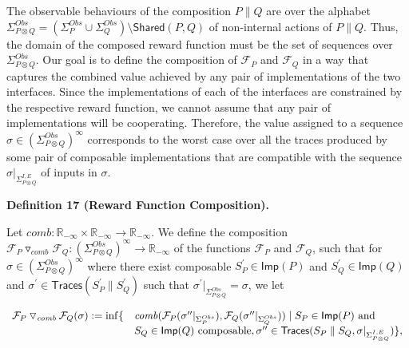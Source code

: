 \documentclass[10pt,a4paper]{article}
\begin{document}
 
 
The observable behaviours of the composition $P\parallel Q$ are over the alphabet $\Sigma_{P\otimes Q}^{Obs}=(\Sigma_{P}^{Obs}\cup\Sigma_{Q}^{Obs})\setminus\mathsf{Shared}(P,Q)$ of non-internal actions of $P\parallel Q$. Thus, the domain of the composed reward function must be the set of sequences over $\Sigma_{P\otimes Q}^{Obs}$. Our goal is to define the composition of $\mathcal{F}_{P}$ and $\mathcal{F}_{Q}$ in a way that captures the combined value achieved by any pair of implementations of the two interfaces. Since the implementations of each of the interfaces are constrained by the respective reward function, we cannot assume that any pair of implementations will be cooperating. Therefore, the value assigned to a sequence $\sigma\in(\Sigma_{P\otimes Q}^{Obs})^{\infty}$ corresponds to the worst case over all the traces produced by some pair of composable implementations that are compatible with the sequence $\sigma|_{\Sigma_{P\otimes Q}^{I,E}}$ of inputs in $\sigma$.\par
 
 
 
\par\medskip\noindent\textbf{Definition 17 (Reward Function Composition).}\par
 
 
Let $\mathit{comb}:\mathbb{R}_{-\infty}\times\mathbb{R}_{-\infty}\to\mathbb{R}_{-\infty}$. We define the composition ${{\mathcal{F}_{P}}\mathbin{\triangledown_{\mathit{comb}}}{\mathcal{F}_{Q}}}:(\Sigma_{P\otimes Q}^{Obs})^{\infty}\to\mathbb{R}_{-\infty}$ of the functions $\mathcal{F}_{P}$ and $\mathcal{F}_{Q}$, such that for $\sigma\in(\Sigma_{P\otimes Q}^{Obs})^{\infty}$ where there exist composable $S_{P}^{\prime}\in\mathsf{Imp}(P)$ and $S_{Q}^{\prime}\in\mathsf{Imp}(Q)$ and $\sigma^{\prime}\in\mathsf{Traces}(S_{P}^{\prime}\parallel S_{Q}^{\prime})$ such that $\sigma^{\prime}|_{\Sigma_{P\otimes Q}^{Obs}}=\sigma$, we let\par
  
\par  \quad  \[\begin{array}[]{ll}{{\mathcal{F}_{P}}\mathbin{\triangledown_{\mathit{comb}}}{\mathcal{F}_{Q}}}(\sigma):=\inf\{&\mathit{comb}(\mathcal{F}_{P}(\sigma^{\prime\prime}|_{\Sigma_{P}^{Obs}}),\mathcal{F}_{Q}(\sigma^{\prime\prime}|_{\Sigma_{Q}^{Obs}}))\mid S_{P}\in\mathsf{Imp}(P)\text{ and }\\
&S_{Q}\in\mathsf{Imp}(Q)\text{ composable},\sigma^{\prime\prime}\in\mathsf{Traces}(S_{P}\parallel S_{Q},\sigma|_{\Sigma_{P\otimes Q}^{I,E}})\},\end{array}\]\quad  \quad  
  
\end{document}
